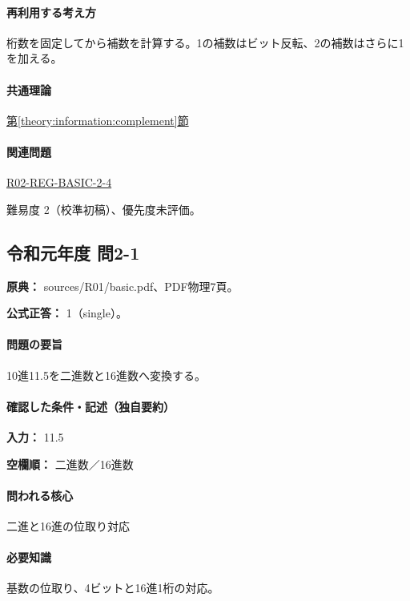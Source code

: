 \paragraph{再利用する考え方} 桁数を固定してから補数を計算する。1の補数はビット反転、2の補数はさらに1を加える。

\paragraph{共通理論} \hyperref[theory:information:complement]{第\ref*{theory:information:complement}節}

\paragraph{関連問題} \hyperref[q:r02-reg-basic-2-4]{R02-REG-BASIC-2-4}

\par 難易度 2（校準初稿）、優先度未評価。

\subsection{令和元年度 問2-1}
\label{q:r01-reg-basic-2-1}

\noindent\textbf{原典：} sources/R01/basic.pdf、PDF物理7頁。

\textbf{公式正答：} 1（single）。

\paragraph{問題の要旨} 10進11.5を二進数と16進数へ変換する。

\paragraph{確認した条件・記述（独自要約）}\mbox{}\par

\noindent\textbf{入力：} 11.5\par

\noindent\textbf{空欄順：} 二進数／16進数\par

\paragraph{問われる核心} 二進と16進の位取り対応

\paragraph{必要知識} 基数の位取り、4ビットと16進1桁の対応。

